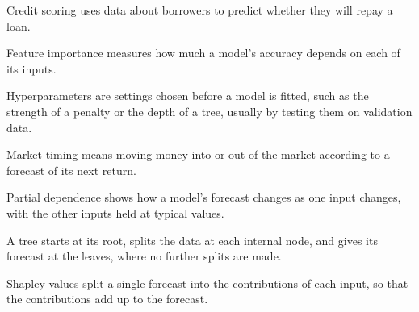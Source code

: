 \begin{keyterms}
\small
\begin{description}[leftmargin=0pt, itemsep=2pt, parsep=0pt, font=\normalfont\bfseries\color{FEMaroon}]
  \item[Credit scoring.] Credit scoring uses data about borrowers to predict whether they will repay a loan.
  \item[Feature importance.] Feature importance measures how much a model's accuracy depends on each of its inputs.
  \item[Hyperparameters.] Hyperparameters are settings chosen before a model is fitted, such as the strength of a penalty or the depth of a tree, usually by testing them on validation data.
  \item[Market timing.] Market timing means moving money into or out of the market according to a forecast of its next return.
  \item[Partial dependence.] Partial dependence shows how a model's forecast changes as one input changes, with the other inputs held at typical values.
  \item[Root, internal nodes and leaves.] A tree starts at its root, splits the data at each internal node, and gives its forecast at the leaves, where no further splits are made.
  \item[Shapley values.] Shapley values split a single forecast into the contributions of each input, so that the contributions add up to the forecast.
\end{description}
\end{keyterms}
